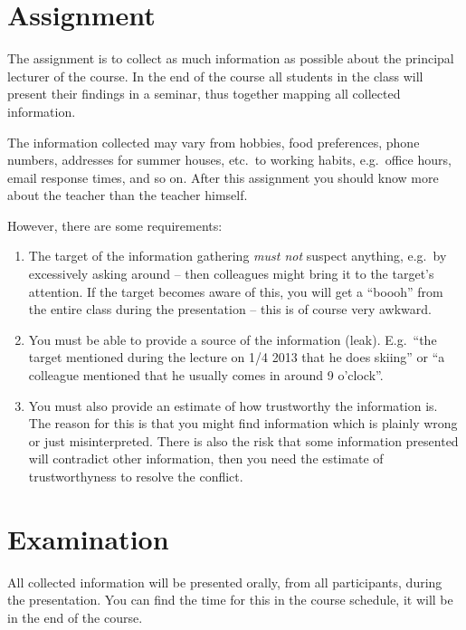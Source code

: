 \documentclass[a4paper,nocourse]{miunasgn}
\begin{document}
\section{Assignment}
\label{sec:assignment}
The assignment is to collect as much information as possible about the 
principal lecturer of the course.
In the end of the course all students in the class will present their findings 
in a seminar, thus together mapping all collected information.

The information collected may vary from hobbies, food preferences, phone 
numbers, addresses for summer houses, etc.\ to working habits, e.g.\ office 
hours, email response times, and so on.
After this assignment you should know more about the teacher than the teacher 
himself.

However, there are some requirements:
\begin{enumerate}
  \item The target of the information gathering \emph{must not} suspect 
    anything, e.g.\ by excessively asking around -- then colleagues might bring 
    it to the target's attention.
    If the target becomes aware of this, you will get a ``boooh'' from the 
    entire class during the presentation -- this is of course very awkward.

  \item You must be able to provide a source of the information (leak).
    E.g.\ ``the target mentioned during the lecture on 1/4 2013 that he does 
    skiing'' or ``a colleague mentioned that he usually comes in around 
    9 o'clock''.

  \item You must also provide an estimate of how trustworthy the information 
    is.
    The reason for this is that you might find information which is plainly 
    wrong or just misinterpreted.
    There is also the risk that some information presented will contradict 
    other information, then you need the estimate of trustworthyness to resolve 
    the conflict.
\end{enumerate}


\section{Examination}
\label{sec:exam}
All collected information will be presented orally, from all participants, 
during the presentation.
You can find the time for this in the course schedule, it will be in the end of 
the course.



\end{document}
